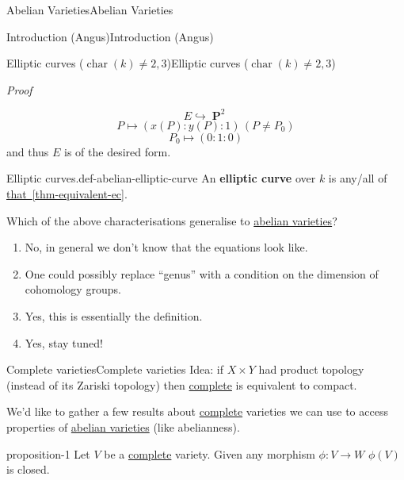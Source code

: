 \documentclass[10pt,]{book}
\makeatletter
\newcommand{\terminology}[1]{\textbf{#1}}
\renewcommand*{\proofname}{Proof}
\renewenvironment{proof}[1][\proofname]{\par
  \pushQED{\qed}%
  \normalfont \topsep6\p@\@plus6\p@\relax
  \trivlist
  \item\relax
    {\itshape
    #1\@addpunct{.}}\hspace\labelsep\ignorespaces
}{%
  \popQED\endtrivlist\@endpefalse
}
\numberwithin{equation}{section}
\DeclareMathOperator{\characteristic}{char}
\DeclareMathOperator{\PP}{\mathbf{P}}
\makeatother
\begin{document}
\begin{chapterptx}{Abelian Varieties}{}{Abelian Varieties}{}{}
\begin{sectionptx}{Introduction (Angus)}{}{Introduction (Angus)}{}{}
\begin{subsectionptx}{Elliptic curves (\(\characteristic(k) \ne 2,3\))}{}{Elliptic curves (\(\characteristic(k) \ne 2,3\))}{}{}
\begin{proof}
\begin{equation*}
E \hookrightarrow \PP^2
\end{equation*}
%
\begin{equation*}
P\mapsto (x(P):y(P): 1) \,(P\ne P_0)
\end{equation*}
%
\begin{equation*}
P_0 \mapsto (0:1 : 0)
\end{equation*}
and thus \(E\) is of the desired form.%
\end{proof}
\begin{definition}{Elliptic curves.}{def-abelian-elliptic-curve}%
\hypertarget{p-17}{}%
An \terminology{elliptic curve} over \(k\) is any/all of \hyperref[thm-equivalent-ec]{that~\ref{thm-equivalent-ec}}.%
\end{definition}
\hypertarget{p-18}{}%
Which of the above characterisations generalise to \hyperref[def-buntes-abvar]{abelian varieties}?\leavevmode%
\begin{enumerate}
\item\hypertarget{li-11}{}No, in general we don't know that the equations look like.%
\item\hypertarget{li-12}{}One could possibly replace ``genus'' with a condition on the dimension of cohomology groups.%
\item\hypertarget{li-13}{}Yes, this is essentially the definition.%
\item\hypertarget{li-14}{}Yes, stay tuned!%
\end{enumerate}
%
\end{subsectionptx}
%
%
\typeout{************************************************}
\typeout{************************************************}
%
\begin{subsectionptx}{Complete varieties}{}{Complete varieties}{}{}\label{subsec-complete-vars}
\hypertarget{p-19}{}%
Idea: if \(X \times Y\) had product topology (instead of its Zariski topology) then \hyperref[def-abelian-complete-var]{complete} is equivalent to compact.%
\par
\hypertarget{p-20}{}%
We'd like to gather a few results about \hyperref[def-abelian-complete-var]{complete} varieties we can use to access properties of \hyperref[def-buntes-abvar]{abelian varieties} (like abelianness).%
\begin{proposition}{}{}{proposition-1}%
\hypertarget{p-21}{}%
Let \(V\) be a \hyperref[def-abelian-complete-var]{complete} variety. Given any morphism \(\phi\colon V \to W\) \(\phi (V) \) is closed.%

\end{proposition}
\end{subsectionptx}
\end{sectionptx}
\end{chapterptx}
\end{document}
